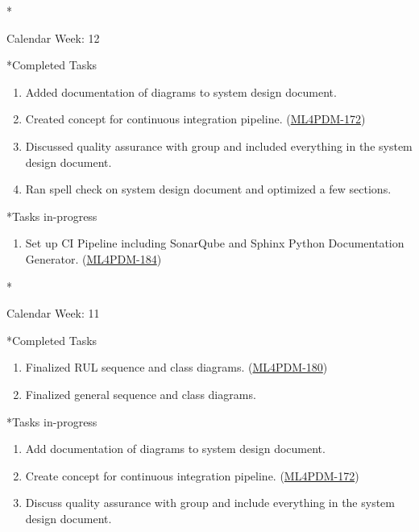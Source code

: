 \documentclass[11pt,a4paper]{article}
\begin{document}
\newpage
\begin{section}*{Calendar Week: 12 \hfill \date{26 March, 2021}}
 \begin{refsection}
   \begin{subsection}*{Completed Tasks}
     \begin{enumerate}
       \item
             Added documentation of diagrams to system design document.
       \item
             Created concept for continuous integration pipeline. (\href{https://ml4pdm.atlassian.net/browse/ML4PDM-172}{ML4PDM-172})
       \item
             Discussed quality assurance with group and included everything in the system design document.
       \item
             Ran spell check on system design document and optimized a few sections.
     \end{enumerate}
   \end{subsection}
   \begin{subsection}*{Tasks in-progress}
     \begin{enumerate}
       \item
             Set up CI Pipeline including SonarQube and Sphinx Python Documentation Generator. (\href{https://ml4pdm.atlassian.net/browse/ML4PDM-184}{ML4PDM-184})
     \end{enumerate}
   \end{subsection}
 \end{refsection}
\end{section}

\newpage
\begin{section}*{Calendar Week: 11 \hfill \date{19 March, 2021}}
 \begin{refsection}
   \begin{subsection}*{Completed Tasks}
     \begin{enumerate}
       \item
             Finalized RUL sequence and class diagrams. (\href{https://ml4pdm.atlassian.net/browse/ML4PDM-180}{ML4PDM-180})
       \item
             Finalized general sequence and class diagrams.
     \end{enumerate}
   \end{subsection}
   \begin{subsection}*{Tasks in-progress}
     \begin{enumerate}
       \item
             Add documentation of diagrams to system design document.
       \item
             Create concept for continuous integration pipeline. (\href{https://ml4pdm.atlassian.net/browse/ML4PDM-172}{ML4PDM-172})
       \item
             Discuss quality assurance with group and include everything in the system design document.
     \end{enumerate}
   \end{subsection}
 \end{refsection}
\end{section}
\end{document}

